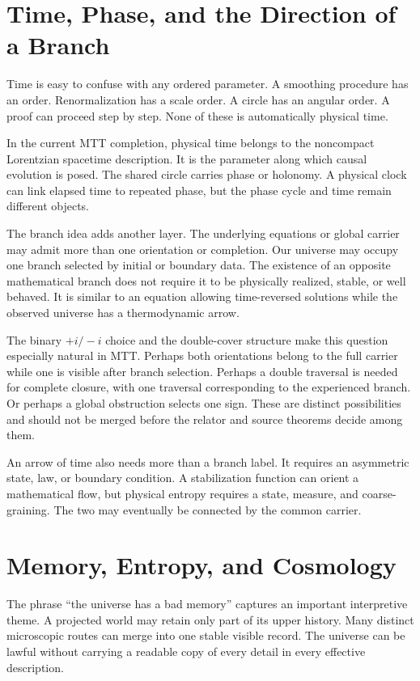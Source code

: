 \documentclass[11pt,openany]{book}
\begin{document}
\chapter{Time, Phase, and the Direction of a Branch}

Time is easy to confuse with any ordered parameter. A smoothing procedure has
an order. Renormalization has a scale order. A circle has an angular order.
A proof can proceed step by step. None of these is automatically physical
time.

In the current MTT completion, physical time belongs to the noncompact
Lorentzian spacetime description. It is the parameter along which causal
evolution is posed. The shared circle carries phase or holonomy. A physical
clock can link elapsed time to repeated phase, but the phase cycle and time
remain different objects.

The branch idea adds another layer. The underlying equations or global
carrier may admit more than one orientation or completion. Our universe may
occupy one branch selected by initial or boundary data. The existence of an
opposite mathematical branch does not require it to be physically realized,
stable, or well behaved. It is similar to an equation allowing time-reversed
solutions while the observed universe has a thermodynamic arrow.

The binary $+i/-i$ choice and the double-cover structure make this question
especially natural in MTT. Perhaps both orientations belong to the full
carrier while one is visible after branch selection. Perhaps a double
traversal is needed for complete closure, with one traversal corresponding to
the experienced branch. Or perhaps a global obstruction selects one sign.
These are distinct possibilities and should not be merged before the relator
and source theorems decide among them.

An arrow of time also needs more than a branch label. It requires an
asymmetric state, law, or boundary condition. A stabilization function can
orient a mathematical flow, but physical entropy requires a state, measure,
and coarse-graining. The two may eventually be connected by the common
carrier.

\chapter{Memory, Entropy, and Cosmology}

The phrase ``the universe has a bad memory'' captures an important
interpretive theme. A projected world may retain only part of its upper
history. Many distinct microscopic routes can merge into one stable visible
record. The universe can be lawful without carrying a readable copy of every
detail in every effective description.
\end{document}
